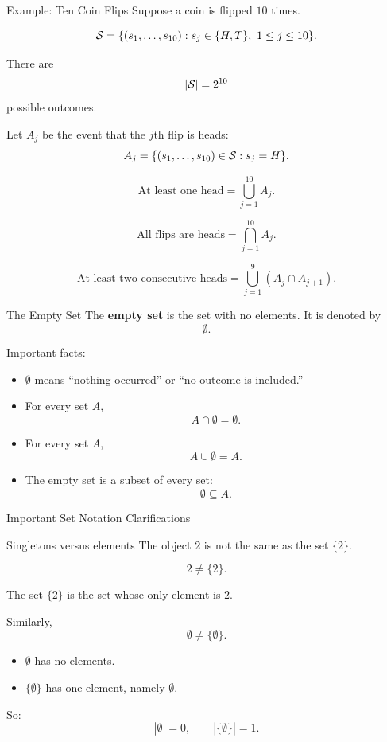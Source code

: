 \begin{frame}{Example: Ten Coin Flips}
Suppose a coin is flipped $10$ times.

\[
\mathcal{S} = \{(s_1,\dots,s_{10}) : s_j \in \{H,T\},\ 1 \le j \le 10\}.
\]

There are
\[
|\mathcal{S}| = 2^{10}
\]
possible outcomes.

Let $A_j$ be the event that the $j$th flip is heads:
\[
A_j = \{(s_1,\dots,s_{10}) \in \mathcal{S} : s_j = H\}.
\]

\[
\text{At least one head}
= \bigcup_{j=1}^{10} A_j.
\]

\[
\text{All flips are heads}
= \bigcap_{j=1}^{10} A_j.
\]

\[
\text{At least two consecutive heads}
= \bigcup_{j=1}^{9} (A_j \cap A_{j+1}).
\]
\end{frame}

\begin{frame}{The Empty Set}
The \textbf{empty set} is the set with no elements. It is denoted by
\[
\emptyset.
\]

\vspace{0.2cm}

Important facts:
\begin{itemize}
    \item $\emptyset$ means ``nothing occurred'' or ``no outcome is included.''
    \item For every set $A$,
    \[
    A \cap \emptyset = \emptyset.
    \]
    \item For every set $A$,
    \[
    A \cup \emptyset = A.
    \]
    \item The empty set is a subset of every set:
    \[
    \emptyset \subseteq A.
    \]
\end{itemize}
\end{frame}

\begin{frame}{Important Set Notation Clarifications}
\begin{keybox}{Singletons versus elements}
The object $2$ is not the same as the set $\{2\}$.

\[
2 \neq \{2\}.
\]

The set $\{2\}$ is the set whose only element is $2$.
\end{keybox}

\vspace{0.25cm}

Similarly,
\[
\emptyset \neq \{\emptyset\}.
\]

\begin{itemize}
    \item $\emptyset$ has no elements.
    \item $\{\emptyset\}$ has one element, namely $\emptyset$.
\end{itemize}

\vspace{0.2cm}

So:
\[
|\emptyset| = 0,
\qquad
|\{\emptyset\}| = 1.
\]
\end{frame}

